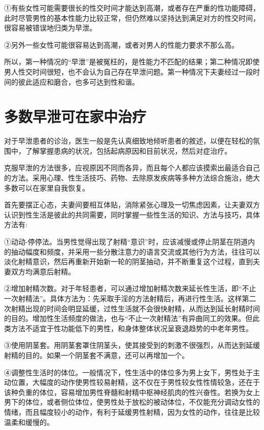 \documentclass[12pt,UTF8]{ctexbook}
\begin{document}
①有些女性可能需要很长的性交时间才能达到高潮，或者存在严重的性功能障碍，此时尽管男性的基本性能力比较正常，但仍然难以坚持达到满足对方的性交时间，很容易被错误地归类为早泄。

②另外一些女性可能很容易达到高潮，或者对男人的性能力要求不那么高。

所以，第一种情况的“早泄”是被冤枉的，是性能力不匹配的结果；第二种情况即使男人性交时间很短，也不会认为自己存在早泄问题。第一种情况下夫妻经过一段时间的彼此适应和磨合，也多可达到性和谐。

\section{多数早泄可在家中治疗}

对于早泄患者的诊治，医生一般是先认真细致地倾听患者的敘述，以便在轻松的氛围中，了解掌握患病的状况，包括起病原因和目前状况，然后对症治疗。

克服早泄的方法很多，应视原因不同而各异，而且每个人都应该摸索出最适合自己的方法。采用心理、性生活技巧、药物、去除原发疾病等多种方法综合施治，绝大多数可以在家里自我恢复。

首先要摆正心态，夫妻间要相互体贴，消除紧张心理及一切焦虑因素，让夫妻双方认识到性生活是彼此的共同需要，同时掌握一些性生活的知识、方法与技巧，具体方法有:

①动动-停停法。当男性觉得出现了射精“意识”时，应该减慢或停止阴茎在阴道内的抽动幅度和频度，并采用一些分散注意力的语言交流或其他行为方法，往往可以淡化射精意识，然后再重新开始新一轮的阴茎抽动，并不断重复这个过程，直到夫妻双方均满意后射精。

②增加射精次数。对于年轻患者，可以通过增加射精次数来延长性生活，即“不止一次射精法”。具体方法为：先采取手淫的方法射精后，再进行性生活。这样第二次射精出现的时间会明显延缓，过性生活就不会很快射精，从而达到延长射精时间的目的。增加性生活频度的做法，也与“不止一次射精法”有异曲同工的效果。但此类方法不适宜于性功能低下的男性，和身体整体状况呈衰退趋势的中老年男性。

③使用阴茎套。用阴茎套罩住阴茎头，使其接受到的刺激不很强烈，从而达到延缓射精的目的。如果一个阴茎套不满意，还可以再增加一个。

④调整性生活时的体位。一般情况下，性生活中的体位多为男上女下，男性处于主动位置，大幅度的动作使男性较易射精，这不仅在于男性较女性性情较急，还在于该种负重的体位，容易增加男性脊髓和射精中枢神经肌肉的性兴奋性。若换为女上男下的体位，或者侧位体位，使男性处于放松的被动体位，不仅能充分调动女性的情绪，而且幅度较小的动作，有利于延缓男性射精，因为女性的动作，往往是比较温柔和缓慢的。
\end{document}
